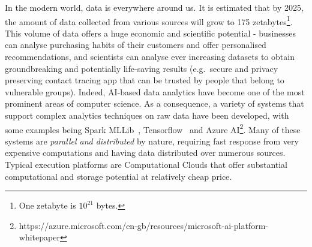\documentclass[a4paper,11pt]{article}
\begin{document}
In the modern world, data is everywhere around us. It is estimated that by 2025, the amount of data collected from various sources will grow to 175 zetabytes\footnote{One zetabyte is $10^{21}$ bytes.}. %
This volume of data offers a huge economic and scientific potential - businesses can analyse purchasing habits of their customers and offer personalised recommendations, and scientists can analyse ever increasing datasets to obtain groundbreaking and potentially life-saving results (e.g.~secure and privacy preserving contact tracing app that can be trusted by people that belong to vulnerable groups). Indeed, AI-based data analytics have become one of the most prominent areas of computer science. As a consequence, a variety of systems that support complex analytics techniques on raw data have been developed, with some examples being Spark MLLib~\cite{mllib}, Tensorflow~\cite{tensorflow} and Azure AI\footnote{https://azure.microsoft.com/en-gb/resources/microsoft-ai-platform-whitepaper}. Many of these systems are \emph{parallel and distributed} by nature, requiring fast response from very expensive computations and having data distributed over numerous sources. Typical execution platforms are Computational Clouds that offer substantial computational and storage potential at relatively cheap price. 
%
\end{document}
